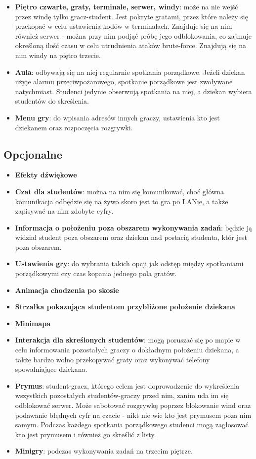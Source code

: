 \documentclass[]{report}
\begin{document}
\begin{itemize}
	\item \textbf{Piętro czwarte, graty, terminale, serwer, windy}: może na nie wejść przez windę tylko gracz-student. Jest pokryte gratami, przez które należy się przekopać w celu ustawienia kodów w terminalach. Znajduje się na nim również serwer - można przy nim podjąć próbę jego odblokowania, co zajmuje określoną ilość czasu w celu utrudnienia ataków brute-force. Znajdują się na nim windy na piętro trzecie.
	\item \textbf{Aula}: odbywają się na niej regularnie spotkania porządkowe. Jeżeli dziekan użyje alarmu przeciwpożarowego, spotkanie porządkowe jest zwoływane natychmiast. Studenci jedynie obserwują spotkania na niej, a dziekan wybiera studentów do skreślenia.
	\item \textbf{Menu gry}: do wpisania adresów innych graczy, ustawienia kto jest dziekanem oraz rozpoczęcia rozgrywki.
\end{itemize}
\subsection{Opcjonalne}
\begin{itemize}
	\item \textbf{Efekty dźwiękowe}
	\item \textbf{Czat dla studentów}: można na nim się komunikować, choć główna komunikacja odbędzie się na żywo skoro jest to gra po LANie, a także zapisywać na nim zdobyte cyfry.
	\item \textbf{Informacja o położeniu poza obszarem wykonywania zadań}: będzie ją widział student poza obszarem oraz dziekan nad postacią studenta, któr jest poza obszarem.
	\item \textbf{Ustawienia gry}: do wybrania takich opcji jak odstęp między spotkaniami porządkowymi czy czas kopania jednego pola gratów.
	\item \textbf{Animacja chodzenia po skosie}
	\item \textbf{Strzałka pokazująca studentom przybliżone położenie dziekana}
	\item \textbf{Minimapa}
	\item \textbf{Interakcja dla skreślonych studentów}: mogą poruszać się po mapie w celu informowania pozostałych graczy o dokładnym położeniu dziekana, a także bardzo wolno przekopywać graty oraz wykonywać telefony spowalniające dziekana.
	\item \textbf{Prymus}: student-gracz, którego celem jest doprowadzenie do wykreślenia wszystkich pozostałych studentów-graczy przed nim, zanim uda im się odblokować serwer. Może sabotować rozgrywkę poprzez blokowanie wind oraz podawanie błędnych cyfr na czacie - nikt nie wie kto jest prymusem poza nim samym. Podczas każdego spotkania porządkowego studenci mogą zagłosować kto jest prymusem i również go skreślić z listy.
	\item \textbf{Minigry}: podczas wykonywania zadań na trzecim piętrze.
\end{itemize}
\end{document}
